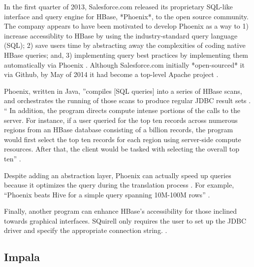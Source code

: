      In the first quarter of 2013, Salesforce.com released its
     proprietary SQL-like interface and query engine for HBase,
     *Phoenix*, to the open source community.  The company appears to
     have been motivated to develop Phoenix as a way to 1) increase
     accessiblity to HBase by using the industry-standard query
     language (SQL); 2) save users time by abstracting away the
     complexities of coding native HBase queries; and, 3) implementing
     query best practices by implementing them automatically via
     Phoenix \cite{www-phoenix-cloudera}. Although Salesforce.com
     initially *open-sourced* it via Github, by May of 2014 it had
     become a top-level Apache project \cite{www-phoenix-wikipedia}.

     Phoenix, written in Java, ''compiles [SQL queries] into a series
     of HBase scans, and orchestrates the running of those scans to
     produce regular JDBC result sets \cite{www-apachephoenix-org}. ``
     In addition, the program directs compute intense portions of the
     calls to the server.  For instance, if a user queried for the top
     ten records across numerous regions from an HBase database
     consisting of a billion records, the program would first select
     the top ten records for each region using server-side compute
     resources.  After that, the client would be tasked with selecting
     the overall top ten'' \cite{www-phoenix-salesforcedev}.

     Despite adding an abstraction layer, Phoenix can actually speed
     up queries because it optimizes the query during the translation
     process \cite{www-phoenix-cloudera}. For example, ``Phoenix
     beats Hive for a simple query spanning 10M-100M rows''
     \cite{www-phoenix-infoq}.

     Finally, another program can enhance HBase's accessibility for
     those inclined towards graphical interfaces.  SQuirell only
     requires the user to set up the JDBC driver and specify the
     appropriate connection string. \cite{www-phoenix-bighadoop}.

\subsection{Impala}


